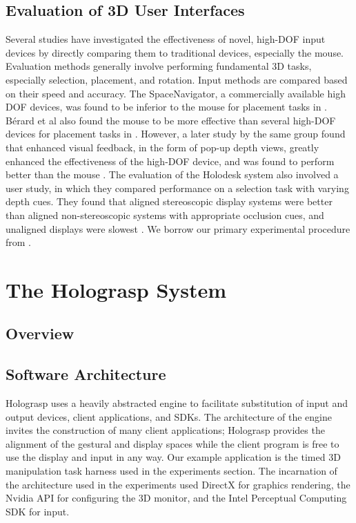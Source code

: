 \documentclass[pageno]{jpaper}
\begin{document}
\subsection{Evaluation of 3D User Interfaces}
Several studies have investigated the effectiveness of novel, high-DOF input devices by directly comparing them to traditional devices, especially the mouse.
Evaluation methods generally involve performing fundamental 3D tasks, especially selection, placement, and rotation. Input methods are compared based on their
speed and accuracy. The SpaceNavigator, a commercially available high DOF devices, was found to be inferior to the mouse for placement tasks in
\cite{mattheiss2011navigating}. B{\'e}rard et al also found the mouse to be more effective than several high-DOF devices for placement tasks
in \cite{study1}.  However, a later study by the same group found that enhanced visual feedback, in the form of pop-up depth views, greatly enhanced the effectiveness
of the high-DOF device, and was found to perform better than the mouse \cite{study2}. The
evaluation of the Holodesk system also involved a user study, in which they compared performance on a selection task with varying depth cues. They found that aligned
stereoscopic display systems were better than aligned non-stereoscopic systems with appropriate occlusion cues, and unaligned displays were slowest \cite{holodesk}.
We borrow our primary experimental procedure from \cite{study1, study2}.
\section{The Holograsp System}
\subsection{Overview}
\subsection{Software Architecture}
Holograsp uses a heavily abstracted engine to facilitate substitution of input and output devices, client applications, and SDKs.
The architecture of the engine invites the construction of many client applications; Holograsp provides the alignment of the
gestural and display spaces while the client program is free to use the display and input in any way. Our example application
is the timed 3D manipulation task harness used in the experiments section. The incarnation of the architecture used in the
experiments used DirectX for graphics rendering, the Nvidia API for configuring the 3D monitor, and the Intel Perceptual
Computing SDK for input.
\end{document}
